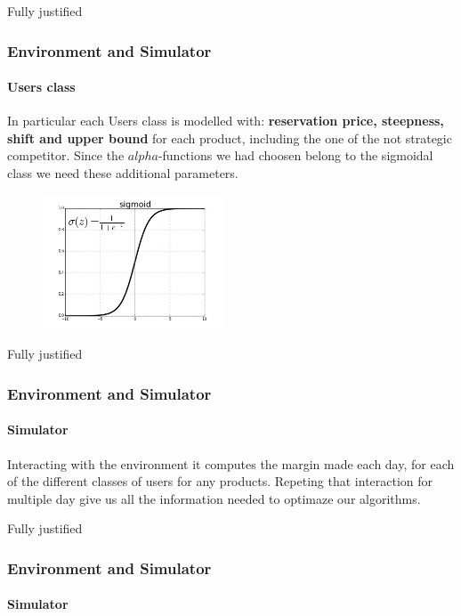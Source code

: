 \documentclass{beamer}
\begin{document}
\begin {frame}{Fully justified}

\frametitle{Environment and Simulator}
\framesubtitle{Users class}
In particular each Users class is modelled with:\textbf{ reservation price, steepness, shift and upper bound}
for each product, including the one of the not strategic competitor.
Since the $alpha$-functions we had choosen belong to the sigmoidal class we need these additional parameters.

\begin{figure}[⟨b⟩]  
\includegraphics[height=4cm]{img/Graphs/sigmoid.png}
    \end{figure}
\end {frame}

\begin {frame}{Fully justified}

\frametitle{Environment and Simulator}
\framesubtitle{Simulator}
Interacting with the environment it computes the margin made each day, for each of the different classes of users for any products.
Repeting that interaction for multiple day give us all the information needed to optimaze our algorithms.
\end{frame}


\begin {frame}{Fully justified}
\frametitle{Environment and Simulator}
\framesubtitle{Simulator}

\end{frame}
\end{document}
